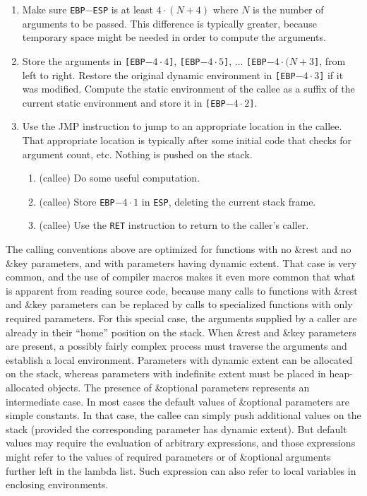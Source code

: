 \begin{enumerate}
\item Make sure \texttt{EBP}$-$\texttt{ESP} is at least $4 \cdot (N +
  4)$ where $N$ is the number of arguments to be passed.  This
  difference is typically greater, because temporary space might be
  needed in order to compute the arguments.
\item Store the arguments in
  \texttt{[EBP$- 4 \cdot 4$]},
  \texttt{[EBP$- 4 \cdot 5$]},
  $\ldots$
  \texttt{[EBP$- 4 \cdot (N + 3$]},
  from left to right.
  Restore the original dynamic environment in
  \texttt{[EBP$- 4 \cdot 3$]}
  if it was modified.  Compute the static environment of the callee as
  a suffix of the current static environment and store it in
  \texttt{[EBP$- 4 \cdot 2$]}.
\item Use the JMP instruction to jump to an appropriate location in
  the callee.  That appropriate location is typically after some
  initial code that checks for argument count, etc.  Nothing is pushed
  on the stack.
  \begin{enumerate}
  \item (callee) Do some useful computation.
  \item (callee) Store \texttt{EBP$- 4 \cdot 1$} in \texttt{ESP},
    deleting the current stack frame.
  \item (callee) Use the \texttt{RET} instruction to return to the
    caller's caller.
  \end{enumerate}
\end{enumerate}

The calling conventions above are optimized for functions with no
\&rest and no \&key parameters, and with parameters having dynamic
extent.  That case is very common, and the use of compiler macros
makes it even more common that what is apparent from reading source
code, because many calls to functions with \&rest and \&key parameters
can be replaced by calls to specialized functions with only required
parameters.  For this special case, the arguments supplied by a caller
are already in their ``home'' position on the stack.  When \&rest and
\&key parameters are present, a possibly fairly complex process must
traverse the arguments and establish a local environment.  Parameters
with dynamic extent can be allocated on the stack, whereas parameters
with indefinite extent must be placed in heap-allocated objects.
  The presence of
\&optional parameters represents an intermediate case.  In most cases
the default values of \&optional parameters are simple constants.  In
that case, the callee can simply push additional values on the stack
(provided the corresponding parameter has dynamic extent).  But
default values may require the evaluation of arbitrary expressions,
and those expressions might refer to the values of required parameters
or of \&optional arguments further left in the lambda list.  Such
expression can also refer to local variables in enclosing
environments.

